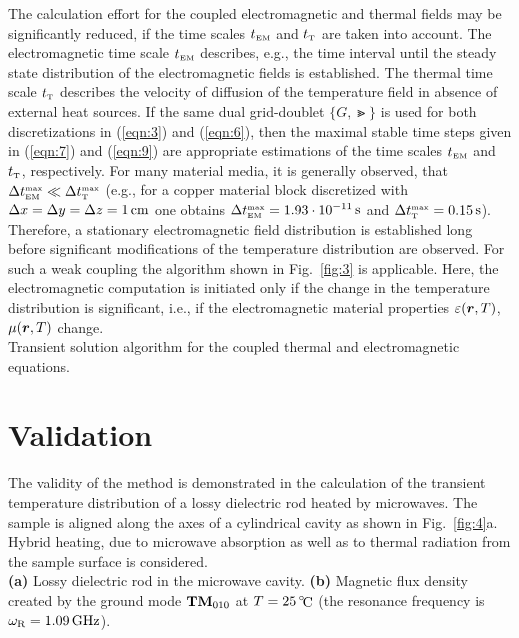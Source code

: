 \documentclass[twocolumn]{IEEEtran}
\begin{document}
The calculation effort for the coupled electromagnetic and thermal fields
may be significantly reduced, if the time scales $t_{\rm\scriptscriptstyle EM}$ and
$t_{\rm\scriptscriptstyle T}$ are taken into account. The electromagnetic time
scale $t_{\rm\scriptscriptstyle EM}$ describes, e.g., the time interval until the
steady state distribution of the electromagnetic fields is established.
The thermal time scale $t_{\rm\scriptscriptstyle T}$ describes the velocity of diffusion
of the temperature field in absence of external heat sources. If the
same dual grid-doublet $\{G,\Gt\}$ is used for both discretizations
in (\ref{eqn:3}) and (\ref{eqn:6}), then the maximal stable time steps
given in (\ref{eqn:7}) and (\ref{eqn:9}) are appropriate estimations
of the time scales $t_{\rm\scriptscriptstyle EM}$ and $t_{\rm\scriptscriptstyle T}$, respectively.
For many material media, it is generally observed, that
$\Delta t^{\rm\scriptscriptstyle max}_{\rm\scriptscriptstyle EM} \ll \Delta t^{\rm\scriptscriptstyle max}_{\rm\scriptscriptstyle T}$
(e.g., for a copper material block discretized with $\Delta x =
\Delta y = \Delta z = \nmbr{1}\cm$ one obtains
$\Delta t^{\srr max}_{\srr EM} = \nmbr{1.93}\cdot \nmbr{10}^{-11}\secs$
and $\Delta t^{\srr max}_{\srr T} = \nmbr{0.15}\secs$). Therefore,
a stationary electromagnetic field distribution is established long
before significant modifications of the temperature distribution
are observed. For such a weak coupling the algorithm shown in
Fig.~\ref{fig:3} is applicable. Here, the electromagnetic
computation is initiated only if the change in the temperature
distribution is significant, i.e., if the electromagnetic material
properties $\varepsilon(\mbox{\boldmath$r$},T)$, $\mu(\mbox{\boldmath$r$},T)$ change.
\befig[htb]
\centering
\mbox{\epsfxsize=85mm} \\[-5pt]
\caption{Transient solution algorithm for the coupled thermal
and electromagnetic equations.}
\label{fig:3}
\enfig
\section{Validation}
The validity of the method is demonstrated in the calculation
of the transient temperature distribution of a lossy dielectric
rod heated by microwaves. The sample is aligned along the axes
of a cylindrical cavity as shown in Fig.~\ref{fig:4}a. Hybrid heating,
due to microwave absorption as well as to thermal radiation from the
sample surface is considered.
\befig[htb]
\centering
\mbox{\epsfxsize=86mm} \\[-5pt]
\caption{{\bf (a)} Lossy dielectric rod in the microwave cavity.
{\bf (b)} Magnetic flux density created by the ground mode
${\bf TM}_{010}$ at $T=25\,{}^\circ\!\!\mathop{\rm C}\nolimits$ (the resonance frequency
is $\omega_{\rm R}=1.09\mathop{\rm GHz}\nolimits$).}
\label{fig:4}
\enfig
\end{document}
